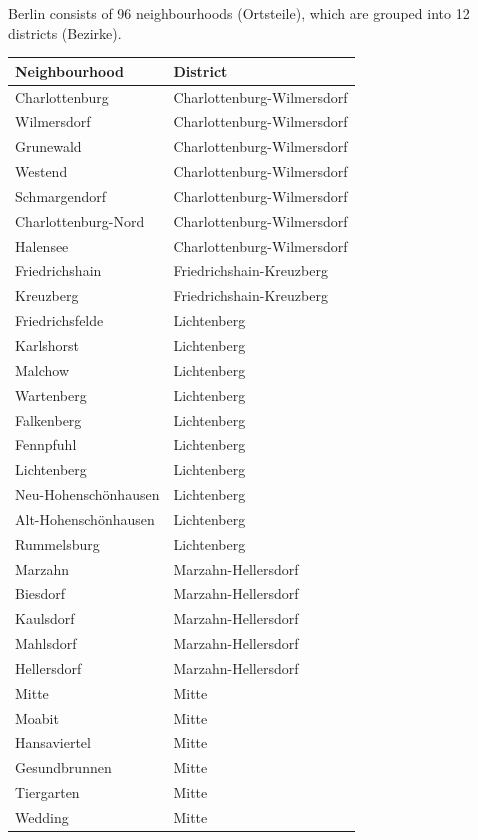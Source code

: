 Berlin consists of 96 neighbourhoods (Ortsteile), which are grouped into 12 districts (Bezirke).

\begin{table}[H]
\centering
\begin{tabular}{ll}
  \hline \hline
Neighbourhood & District \\ 
  \hline
Charlottenburg & Charlottenburg-Wilmersdorf \\ 
  Wilmersdorf & Charlottenburg-Wilmersdorf \\ 
  Grunewald & Charlottenburg-Wilmersdorf \\ 
  Westend & Charlottenburg-Wilmersdorf \\ 
  Schmargendorf & Charlottenburg-Wilmersdorf \\ 
  Charlottenburg-Nord & Charlottenburg-Wilmersdorf \\ 
  Halensee & Charlottenburg-Wilmersdorf \\ 
  Friedrichshain & Friedrichshain-Kreuzberg \\ 
  Kreuzberg & Friedrichshain-Kreuzberg \\ 
  Friedrichsfelde & Lichtenberg \\ 
  Karlshorst & Lichtenberg \\ 
  Malchow & Lichtenberg \\ 
  Wartenberg & Lichtenberg \\ 
  Falkenberg & Lichtenberg \\ 
  Fennpfuhl & Lichtenberg \\ 
  Lichtenberg & Lichtenberg \\ 
  Neu-Hohenschönhausen & Lichtenberg \\ 
  Alt-Hohenschönhausen & Lichtenberg \\ 
  Rummelsburg & Lichtenberg \\ 
  Marzahn & Marzahn-Hellersdorf \\ 
  Biesdorf & Marzahn-Hellersdorf \\ 
  Kaulsdorf & Marzahn-Hellersdorf \\ 
  Mahlsdorf & Marzahn-Hellersdorf \\ 
  Hellersdorf & Marzahn-Hellersdorf \\ 
  Mitte & Mitte \\ 
  Moabit & Mitte \\ 
  Hansaviertel & Mitte \\ 
  Gesundbrunnen & Mitte \\ 
  Tiergarten & Mitte \\ 
  Wedding & Mitte \\ 

\end{tabular}
\end{table}
